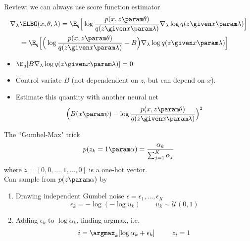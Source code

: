 \begin{frame}
    
    Review: we can always use score function estimator 
\begin{align*}
 \nabla_\lambda &\ELBO(x, \theta, \lambda) = \E_{q}\Big[\log \frac{p(x, z \param \theta)}{q(z \given x \param \lambda)}\nabla_{\lambda}\log q(z \given x \param \lambda)\Big]     \\
 &= \E_{q}\Big[\Big(\log \frac{p(x, z \param \theta)}{q(z \given x \param \lambda)}- B\Big)\nabla_{\lambda}\log q(z \given x \param \lambda)\Big] 
\end{align*}

\begin{itemize}
\item $\E_q[B \nabla_\lambda \log q(z \given x \param \lambda)] = 0$ \pause
    \item Control variate $B$ (not dependendent on $z$, but can depend on $x$). 
    \item Estimate this quantity with another neural net \citep{Mnih2014}
    \[ \Big( B(x \param \psi) -\log \frac{p(x, z \param \theta)}{q(z \given x \param \lambda)} \Big)^2 \]
\end{itemize}

    
\end{frame}
\begin{frame}


The ``Gumbel-Max" trick \citep{Papandreou2011}
\[ p(z_k = 1 \param \alpha) = \frac{\alpha_k}{\sum_{j=1}^K \alpha_j} \]
where $z = [0, 0, \dots, 1 , \dots, 0]$ is a one-hot vector. \\
\pause
Can sample from $p(z \param \alpha)$ by
\begin{enumerate}
    \item Drawing independent Gumbel noise $\epsilon =  \epsilon_1, \dots, \epsilon_K$
    \[ \epsilon_k = -\log (- \log u_k) \,\,\,\,\,\,\,\,\,\,\,\,\, u_k \sim \mathcal{U}(0, 1)\]
    \item Adding $\epsilon_k$ to $\log \alpha_k$, finding argmax, i.e.
    \[ i = \argmax_k [\log \alpha_k + \epsilon_k] \,\,\,\,\,\,\,\,\,\,\,\,\,\,\,
    z_i = 1 \]
\pause
\end{enumerate}

\end{frame}

